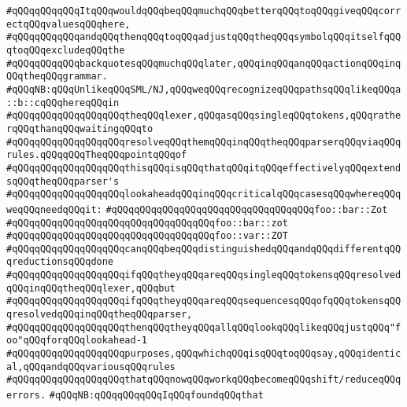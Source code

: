 \verb|#qQQqqQQqqQQqItqQQqwouldqQQqbeqQQqmuchqQQqbetterqQQqtoqQQqgiveqQQqcorrectqQQqvaluesqQQqhere,|\newline
\verb|#qQQqqQQqqQQqandqQQqthenqQQqtoqQQqadjustqQQqtheqQQqsymbolqQQqitselfqQQqtoqQQqexcludeqQQqthe|\newline
\verb|#qQQqqQQqqQQqbackquotesqQQqmuchqQQqlater,qQQqinqQQqanqQQqactionqQQqinqQQqtheqQQqgrammar.|\newline
\newline
\newline
\newline
\verb|#qQQqNB:qQQqUnlikeqQQqSML/NJ,qQQqweqQQqrecognizeqQQqpathsqQQqlikeqQQqa::b::cqQQqhereqQQqin|\newline
\verb|#qQQqqQQqqQQqqQQqqQQqtheqQQqlexer,qQQqasqQQqsingleqQQqtokens,qQQqratherqQQqthanqQQqwaitingqQQqto|\newline
\verb|#qQQqqQQqqQQqqQQqqQQqresolveqQQqthemqQQqinqQQqtheqQQqparserqQQqviaqQQqrules.qQQqqQQqTheqQQqpointqQQqof|\newline
\verb|#qQQqqQQqqQQqqQQqqQQqthisqQQqisqQQqthatqQQqitqQQqeffectivelyqQQqextendsqQQqtheqQQqparser's|\newline
\verb|#qQQqqQQqqQQqqQQqqQQqlookaheadqQQqinqQQqcriticalqQQqcasesqQQqwhereqQQqweqQQqneedqQQqit:|\newline
\verb|#qQQqqQQqqQQqqQQqqQQqqQQqqQQqqQQqqQQqfoo::bar::Zot|\newline
\verb|#qQQqqQQqqQQqqQQqqQQqqQQqqQQqqQQqqQQqfoo::bar::zot|\newline
\verb|#qQQqqQQqqQQqqQQqqQQqqQQqqQQqqQQqqQQqfoo::var::ZOT|\newline
\verb|#qQQqqQQqqQQqqQQqqQQqcanqQQqbeqQQqdistinguishedqQQqandqQQqdifferentqQQqreductionsqQQqdone|\newline
\verb|#qQQqqQQqqQQqqQQqqQQqifqQQqtheyqQQqareqQQqsingleqQQqtokensqQQqresolvedqQQqinqQQqtheqQQqlexer,qQQqbut|\newline
\verb|#qQQqqQQqqQQqqQQqqQQqifqQQqtheyqQQqareqQQqsequencesqQQqofqQQqtokensqQQqresolvedqQQqinqQQqtheqQQqparser,|\newline
\verb|#qQQqqQQqqQQqqQQqqQQqthenqQQqtheyqQQqallqQQqlookqQQqlikeqQQqjustqQQq"foo"qQQqforqQQqlookahead-1|\newline
\verb|#qQQqqQQqqQQqqQQqqQQqpurposes,qQQqwhichqQQqisqQQqtoqQQqsay,qQQqidentical,qQQqandqQQqvariousqQQqrules|\newline
\verb|#qQQqqQQqqQQqqQQqqQQqthatqQQqnowqQQqworkqQQqbecomeqQQqshift/reduceqQQqerrors.|\newline
\newline
\verb|#qQQqNB:qQQqqQQqqQQqIqQQqfoundqQQqthat|\newline
